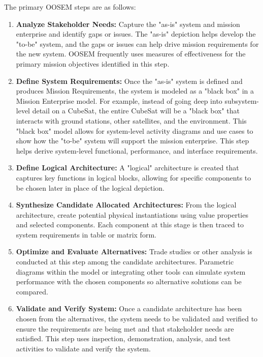 The primary OOSEM steps are as follows:
\begin{enumerate}
\item{\textbf{Analyze Stakeholder Needs:} Capture the "as-is" system and mission enterprise and identify gaps or issues. The "as-is" depiction helps develop the "to-be" system, and the gaps or issues can help drive mission requirements for the new system. OOSEM frequently uses measures of effectiveness for the primary mission objectives identified in this step.}
\item{\textbf{Define System Requirements:} Once the "as-is" system is defined and produces Mission Requirements, the system is modeled as a "black box" in a Mission Enterprise model. For example, instead of going deep into subsystem-level detail on a CubeSat, the entire CubeSat will be a "black box" that interacts with ground stations, other satellites, and the environment. This "black box" model allows for system-level activity diagrams and use cases to show how the "to-be" system will support the mission enterprise. This step helps derive system-level functional, performance, and interface requirements.}
\item{\textbf{Define Logical Architecture:} A "logical" architecture is created that captures key functions in logical blocks, allowing for specific components to be chosen later in place of the logical depiction.}
\item{\textbf{Synthesize Candidate Allocated Architectures:} From the logical architecture, create potential physical instantiations using value properties and selected components. Each component at this stage is then traced to system requirements in table or matrix form.}
\item{\textbf{Optimize and Evaluate Alternatives:} Trade studies or other analysis is conducted at this step among the candidate architectures. Parametric diagrams within the model or integrating other tools can simulate system performance with the chosen components so alternative solutions can be compared.}
\item{\textbf{Validate and Verify System:} Once a candidate architecture has been chosen from the alternatives, the system needs to be validated and verified to ensure the requirements are being met and that stakeholder needs are satisfied. This step uses inspection, demonstration, analysis, and test activities to validate and verify the system.}
\end{enumerate}

